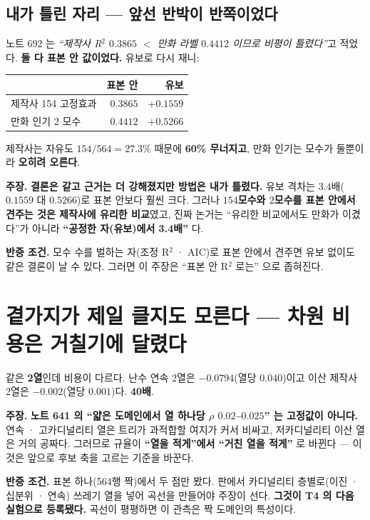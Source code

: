 \documentclass[10pt,a4paper]{article}
\newcommand{\claim}[2]{\begin{claimbox}\textbf{주장.} #1\par\smallskip
  \textcolor{gray!70}{\textbf{반증 조건.} #2}\end{claimbox}}
\begin{document}
\subsection*{내가 틀린 자리 --- 앞선 반박이 반쪽이었다}

노트 692 는 \emph{``제작사 R$^2$ $0.3865$ $<$ 만화 라벨 $0.4412$ 이므로 비평이
틀렸다''}고 적었다. \textbf{둘 다 표본 안 값이었다.} 유보로 다시 재니:

\begin{center}
\begin{tabular}{lrr}
\toprule
 & 표본 안 & 유보 \\
\midrule
제작사 154 고정효과 & $0.3865$ & $\mathbf{+0.1559}$ \\
만화 인기 2 모수 & $0.4412$ & $\mathbf{+0.5266}$ \\
\bottomrule
\end{tabular}
\end{center}

제작사는 자유도 $154/564 = 27.3\%$ 때문에 \textbf{60\% 무너지고}, 만화 인기는 모수가
둘뿐이라 \textbf{오히려 오른다}.

\claim{\textbf{결론은 같고 근거는 더 강해졌지만 방법은 내가 틀렸다.} 유보 격차는
$3.4$배($0.1559$ 대 $0.5266$)로 표본 안보다 훨씬 크다. 그러나 \textbf{$154$모수와
$2$모수를 표본 안에서 견주는 것은 제작사에 유리한 비교}였고, 진짜 논거는 ``유리한
비교에서도 만화가 이겼다''가 아니라 \textbf{``공정한 자(유보)에서 3.4배''} 다.}
{모수 수를 벌하는 자(조정 R$^2$ · AIC)로 표본 안에서 견주면 유보 없이도 같은 결론이
날 수 있다. 그러면 이 주장은 ``표본 안 R$^2$ 로는'' 으로 좁혀진다.}

\section{곁가지가 제일 클지도 모른다 --- 차원 비용은 거칠기에 달렸다}

같은 \textbf{2열}인데 비용이 다르다. 난수 연속 2열은 $-0.0794$(열당 $0.040$)이고
이산 제작사 2열은 $-0.002$(열당 $0.001$)다. \textbf{40배}.

\claim{\textbf{노트 641 의 ``얇은 도메인에서 열 하나당 $\rho$ $0.02$--$0.025$'' 는
고정값이 아니다.} 연속 · 고카디널리티 열은 트리가 과적합할 여지가 커서 비싸고,
저카디널리티 이산 열은 거의 공짜다. 그러므로 규율이 \textbf{``열을 적게''에서
``거친 열을 적게''} 로 바뀐다 --- 이것은 앞으로 후보 축을 고르는 기준을 바꾼다.}
{표본 하나(564행 짝)에서 두 점만 봤다. 판에서 카디널리티 층별로(이진 · 십분위 ·
연속) 쓰레기 열을 넣어 곡선을 만들어야 주장이 선다. \textbf{그것이 T4 의 다음
실험으로 등록됐다.} 곡선이 평평하면 이 관측은 짝 도메인의 특성이다.}
\end{document}
